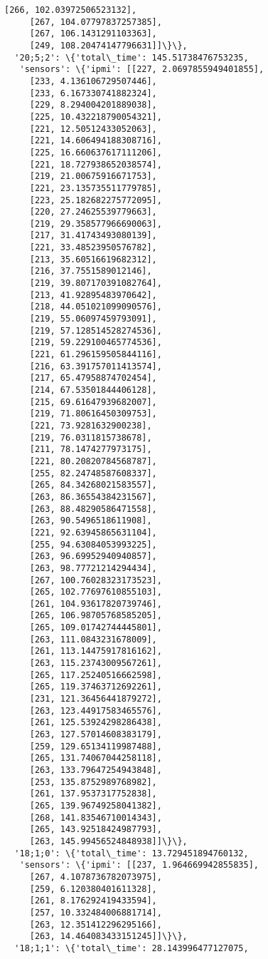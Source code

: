 \documentclass[11pt]{article}
\begin{document}
\begin{tcolorbox}[breakable, size=fbox, boxrule=.5pt, pad at break*=1mm, opacityfill=0]
\begin{Verbatim}[commandchars=\\\{\}]
     [266, 102.03972506523132],
     [267, 104.07797837257385],
     [267, 106.1431291103363],
     [249, 108.20474147796631]]\}\},
  '20;5;2': \{'total\_time': 145.51738476753235,
   'sensors': \{'ipmi': [[227, 2.0697855949401855],
     [233, 4.136106729507446],
     [233, 6.167330741882324],
     [229, 8.294004201889038],
     [225, 10.432218790054321],
     [221, 12.50512433052063],
     [221, 14.606494188308716],
     [225, 16.660637617111206],
     [221, 18.727938652038574],
     [219, 21.00675916671753],
     [221, 23.135735511779785],
     [223, 25.182682275772095],
     [220, 27.24625539779663],
     [219, 29.358577966690063],
     [217, 31.41743493080139],
     [221, 33.48523950576782],
     [213, 35.60516619682312],
     [216, 37.7551589012146],
     [219, 39.807170391082764],
     [213, 41.92895483970642],
     [218, 44.051021099090576],
     [219, 55.06097459793091],
     [219, 57.128514528274536],
     [219, 59.229100465774536],
     [221, 61.296159505844116],
     [216, 63.391757011413574],
     [217, 65.47958874702454],
     [214, 67.53501844406128],
     [215, 69.61647939682007],
     [219, 71.80616450309753],
     [221, 73.9281632900238],
     [219, 76.0311815738678],
     [211, 78.1474277973175],
     [221, 80.20820784568787],
     [255, 82.24748587608337],
     [265, 84.34268021583557],
     [263, 86.36554384231567],
     [263, 88.48290586471558],
     [263, 90.5496518611908],
     [221, 92.63945865631104],
     [255, 94.63084053993225],
     [263, 96.69952940940857],
     [263, 98.77721214294434],
     [267, 100.76028323173523],
     [265, 102.77697610855103],
     [261, 104.93617820739746],
     [265, 106.98705768585205],
     [265, 109.01742744445801],
     [263, 111.0843231678009],
     [261, 113.14475917816162],
     [263, 115.23743009567261],
     [265, 117.25240516662598],
     [265, 119.37463712692261],
     [231, 121.36456441879272],
     [263, 123.44917583465576],
     [261, 125.53924298286438],
     [263, 127.57014608383179],
     [259, 129.65134119987488],
     [265, 131.74067044258118],
     [263, 133.79647254943848],
     [253, 135.8752989768982],
     [261, 137.9537317752838],
     [265, 139.96749258041382],
     [268, 141.83546710014343],
     [265, 143.92518424987793],
     [263, 145.99456524848938]]\}\},
  '18;1;0': \{'total\_time': 13.729451894760132,
   'sensors': \{'ipmi': [[237, 1.964669942855835],
     [267, 4.1078736782073975],
     [259, 6.120380401611328],
     [261, 8.176292419433594],
     [257, 10.332484006881714],
     [263, 12.351412296295166],
     [263, 14.464083433151245]]\}\},
  '18;1;1': \{'total\_time': 28.143996477127075,

\end{Verbatim}
\end{tcolorbox}
\end{document}
